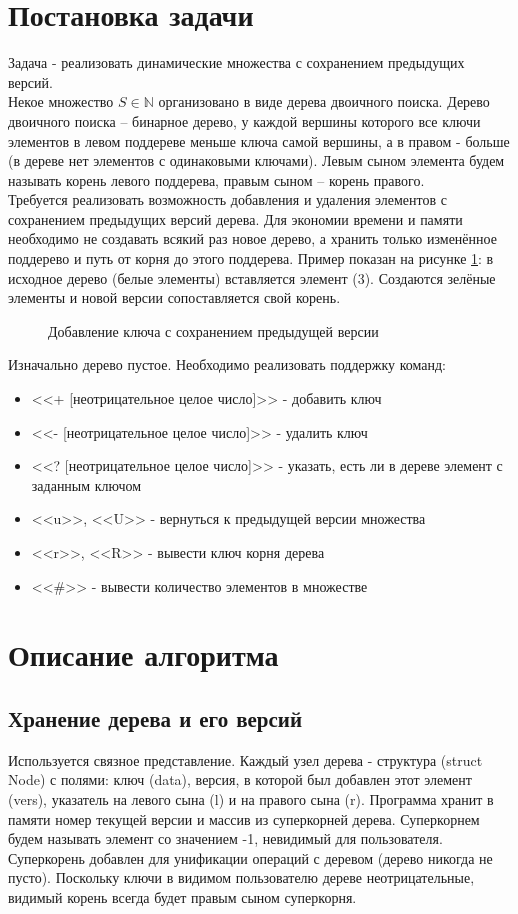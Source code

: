 \documentclass[zuev-23631-2-report.tex]{subfiles}
\begin{document}
\section{Постановка задачи}
Задача - реализовать динамические множества с сохранением предыдущих версий.\\
Некое множество $S \in \mathds{N}$  организовано в виде дерева двоичного поиска. Дерево двоичного поиска --  бинарное дерево, у каждой вершины которого все ключи элементов в левом поддереве меньше ключа самой вершины, а в правом - больше (в дереве нет элементов с одинаковыми ключами). Левым сыном элемента будем называть корень левого поддерева, правым сыном -- корень правого.\\ 
Требуется реализовать возможность добавления и удаления элементов с сохранением предыдущих версий дерева. Для экономии времени и памяти необходимо не создавать всякий раз новое дерево, а хранить только изменённое поддерево и путь от корня до этого поддерева. Пример показан на рисунке \ref{ins1}: в исходное дерево (белые элементы) вставляется элемент (3). Создаются зелёные элементы и новой версии сопоставляется свой корень.\\
\begin{figure}[H]
\caption{Добавление ключа с сохранением предыдущей версии}
\label{ins1}
\end{figure}
Изначально дерево пустое. Необходимо реализовать поддержку команд:
\begin{itemize}
\item{<<+ [неотрицательное целое число]>>} - добавить ключ
\item{<<- [неотрицательное целое число]>>} - удалить ключ
\item{<<? [неотрицательное целое число]>>} - указать, есть ли в дереве элемент с заданным ключом
\item{<<u>>, <<U>>} - вернуться к предыдущей версии множества
\item{<<r>>, <<R>>} - вывести ключ корня дерева
\item{<<\#>>} - вывести количество элементов в множестве
\end{itemize}
\section{Описание алгоритма}
\subsection{Хранение дерева и его версий}
Используется связное представление. Каждый узел дерева - структура (struct Node) с полями: ключ (data), версия, в которой был добавлен этот элемент (vers), указатель на левого сына (l) и на правого сына (r). Программа хранит в памяти номер текущей версии и массив из суперкорней дерева. Суперкорнем будем называть элемент со значением -1, невидимый для пользователя. Суперкорень добавлен для унификации операций с деревом (дерево никогда не пусто). Поскольку ключи  в видимом пользователю дереве неотрицательные, видимый корень всегда будет правым сыном суперкорня.
\end{document}

